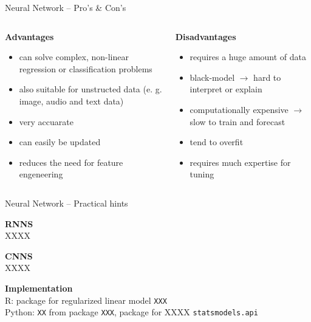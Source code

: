 \documentclass[11pt,compress,t,notes=noshow, xcolor=table]{beamer}
\newcommand{\highlight}[1]{\textcolor{highlightcol}{\textbf{#1}}}
\newcommand{\positem}{\item[$\highlight{+}$]}
\newcommand{\negitem}{\item[$\highlight{-}$]}
\let\code=\texttt
\begin{document}

\begin{frame}{Neural Network -- Pro's \& Con's}

\footnotesize


\begin{columns}[onlytextwidth]
  \begin{column}{0.5\textwidth}
    \highlight{Advantages}
    \footnotesize
    \begin{itemize}
      \positem can solve complex, non-linear regression or classification problems 
      \positem also suitable for unstructed data (e. g. image, audio and text data)  
      \positem very accuarate 
      \positem can easily be updated %
      \positem reduces the need for feature engeneering
    \end{itemize}
  \end{column}

  \begin{column}{0.5\textwidth}
    \highlight{Disadvantages}
    \footnotesize
    \begin{itemize}
      \negitem requires a huge amount of data
      \negitem black-model $\rightarrow$ hard to interpret or explain
      \negitem computationally expensive $\rightarrow$ slow to train and forecast
      \negitem tend to overfit
      \negitem requires much expertise for tuning
    \end{itemize}
  \end{column}
\end{columns}

\vfill

\small


\end{frame}


\begin{frame}{Neural Network -- Practical hints}

\footnotesize

\lz

  \highlight{RNNS} \\
  \smallskip
 XXXX
 
 \highlight{CNNS} \\
  \smallskip
 XXXX
 
 

\lz

  \highlight{Implementation} \\
  \smallskip
  R: package for regularized linear model \code{XXX}\\
  Python: \code{XX} from package \code{XXX}, package for XXXX \code{statsmodels.api}

\end{frame}
\end{document}
